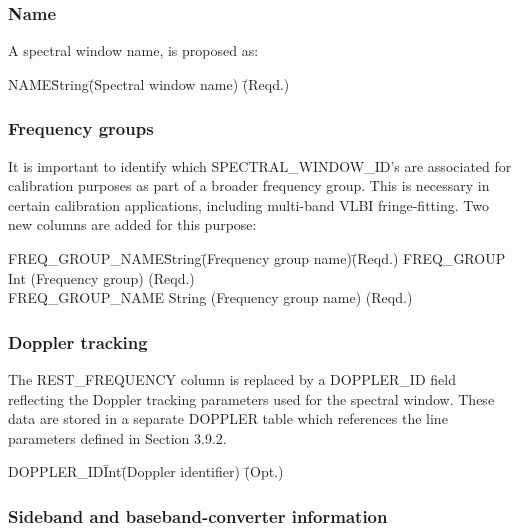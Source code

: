 \documentclass{article}
\begin{document}
\subsubsection{Name}

A spectral window name, is proposed as:

\begin{tabbing}
NAME\quad\quad \= String\quad\quad \= 
(Spectral window name) \quad\quad\quad \= (Reqd.) \\
\end{tabbing}


\subsubsection{Frequency groups}

It is important to identify which SPECTRAL\_WINDOW\_ID's are
associated for calibration purposes as part of a broader frequency
group.  This is necessary in certain calibration applications,
including multi-band VLBI fringe-fitting. Two new columns are
added for this purpose:

\begin{tabbing}
FREQ\_GROUP\_NAME\quad\quad \= String\quad\quad \=
(Frequency group name)\quad\quad \= (Reqd.) \kill
FREQ\_GROUP \> Int \> (Frequency group) \> (Reqd.) \\
FREQ\_GROUP\_NAME \> String \> (Frequency group name) \> (Reqd.) \\
\end{tabbing}

\subsubsection{Doppler tracking}

The REST\_FREQUENCY column is replaced by a DOPPLER\_ID field
reflecting the Doppler tracking parameters used for the spectral
window. These data are stored in a separate DOPPLER table which
references the line parameters defined in Section 3.9.2.

\begin{tabbing}
DOPPLER\_ID\quad\quad \= Int\quad\quad \= 
(Doppler identifier) \quad\quad\quad\quad\quad \= (Opt.) \\
\end{tabbing}

\subsubsection{Sideband and baseband-converter information}
\end{document}
